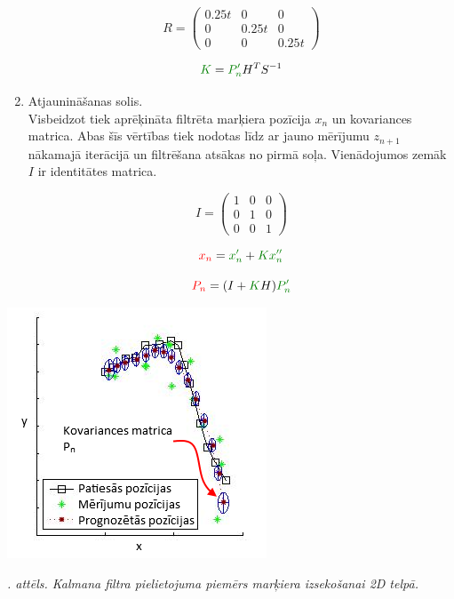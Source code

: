 \documentclass[12pt, a4paper, oneside, openright]{article}
\renewcommand{\thecimages}{\arabic{cimages}}
\begin{document}
\begin{enumerate}
\begin{equation}
R = \begin{pmatrix}
0.25 t & 0 & 0\\
0 & 0.25 t & 0\\
0 & 0 & 0.25 t
\end{pmatrix} 
\end{equation}

\begin{equation}
\textcolor{darkgreen}{K} = \textcolor{darkgreen}{P_{n}'} H^T S^{-1}
\end{equation}

\item Atjaunināšanas solis. \\
Visbeidzot tiek aprēķināta filtrēta marķiera pozīcija $x_n$ un kovariances matrica.
Abas šīs vērtības tiek nodotas līdz ar jauno mērījumu $z_{n+1}$ nākamajā iterācijā un filtrēšana
atsākas no pirmā soļa. Vienādojumos zemāk $I$ ir identitātes matrica.

\begin{equation}
I =  \begin{pmatrix}
1 & 0 & 0\\
0 & 1 & 0\\
0 & 0 & 1
\end{pmatrix}
\end{equation}

\begin{equation}
\textcolor{red}{x_n} = \textcolor{darkgreen}{x_{n}'} + \textcolor{darkgreen}{K x_{n}''}
\end{equation}

\begin{equation}
\textcolor{red}{P_n} = (I + \textcolor{darkgreen}{K} H) \textcolor{darkgreen}{P_{n}'}
\end{equation}

\end{enumerate}

\label{cimages:kalman_example}
\vspace{10pt}
\begin{samepage}
\begin{center}
\includegraphics[width=0.6\columnwidth]{images/kalman_example.png}
\begin{center}
\footnotesize{
\textit{\thecimages. attēls. Kalmana filtra pielietojuma piemērs marķiera izsekošanai 2D telpā.}}
\end{center}
\end{center}
\end{samepage}
\end{document}
